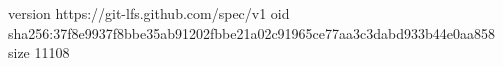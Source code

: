 version https://git-lfs.github.com/spec/v1
oid sha256:37f8e9937f8bbe35ab91202fbbe21a02c91965ce77aa3c3dabd933b44e0aa858
size 11108
